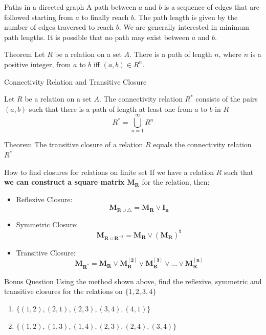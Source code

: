 \documentclass[xcolor=svgnames]{beamer}
\begin{document}
\begin{frame}{Paths in a directed graph}
    A path between $a$ and $b$ is a sequence of edges that are followed starting from $a$ to finally reach $b$. The path length is given by the number of edges traversed to reach $b$. We are generally interested in minimum path lengths. It is possible that no path may exist between $a$ and $b$. 
    \begin{block}{Theorem}
        Let $R$ be a relation on a set $A$. There is a path of length $n$, where $n$ is a positive integer, from $a$ to $b$ iff $(a, b) \in R^n$.
    \end{block}
\end{frame}

\begin{frame}{Connectivity Relation and Transitive Closure}
    \begin{definition}
        Let $R$ be a relation on a set $A$. The connectivity relation $R^*$ consists of the pairs $(a, b)$ such that there is a path of length at least one from $a$ to $b$ in $R$
        \[
            R^* = \bigcup_{n=1}^\infty R^n
        \]
    \end{definition}
    \begin{block}{Theorem}
        The transitive closure of a relation $R$ equals the connectivity relation $R^*$
    \end{block}
\end{frame}

\begin{frame}{How to find closures for relations on finite set}
    If we have a relation $R$ such that \textbf{we can construct a square matrix} $\boldsymbol{M_R}$ for the relation, then: 
    \begin{itemize}
        \item Reflexive Closure: 
        \[
            \boldsymbol{M_{R \cup \bigtriangleup}} = \boldsymbol{M_R} \vee \boldsymbol{I_n}
        \]
        \item Symmetric Closure:
        \[
            \boldsymbol{M_{R \cup R^{-1}}} = \boldsymbol{M_R} \vee \boldsymbol{(M_R)^t}
        \]
        \item Transitive Closure:
        \[
            \boldsymbol{M_{R^*}} = \boldsymbol{M_R} \vee \boldsymbol{M_R^{[2]}} \vee \boldsymbol{M_R^{[3]}} \vee \ldots \vee \boldsymbol{M_R^{[n]}} 
        \]
    \end{itemize}
\end{frame}

\begin{frame}{Bonus Question}
    Using the method shown above, find the reflexive, symmetric and transitive closures for the relations on $\{1, 2, 3, 4\}$
    \begin{enumerate}
        \item $\{(1, 2), (2,1), (2,3), (3,4), (4,1)\}$
        \item $\{(1, 2), (1,3), (1,4), (2,3), (2,4), (3, 4)\}$
    \end{enumerate}
\end{frame}
\end{document}
